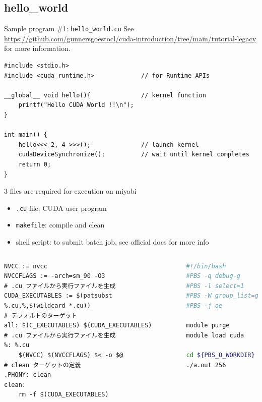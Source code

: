 \documentclass[dvipdfmx, 11pt, aspectratio=169]{beamer}   %
\begin{document}
\subsection{hello\_world}
\begin{frame}[fragile]{Sample program \#1: \texttt{hello\_world.cu}}
  See \url{https://github.com/gunnersgoestocl/cuda-introduction/tree/main/tutorial-legacy} for more information.
\begin{block}{}
  \begin{lstlisting}[language=CUDA]
#include <stdio.h>
#include <cuda_runtime.h>             // for Runtime APIs

__global__ void hello(){              // kernel function
    printf("Hello CUDA World !!\n");
}

int main() {
    hello<<< 2, 4 >>>();              // launch kernel
    cudaDeviceSynchronize();          // wait until kernel completes
    return 0;
}
  \end{lstlisting}
\end{block}
\end{frame}
\begin{frame}[fragile]{3 files are required for execution on miyabi}
  \begin{itemize}
    \item \lstinline|.cu| file: CUDA user program
    \item \lstinline|makefile|: compile and clean
    \item shell script: to submit batch job, see official docs for more info
  \end{itemize}
  \begin{columns}
    \begin{lstlisting}[style=makefilestyle, basicstyle=\ttfamily\tiny]
NVCC := nvcc
NVCCFLAGS := -arch=sm_90 -O3
# .cu ファイルから実行ファイルを生成
CUDA_EXECUTABLES := $(patsubst %.cu,%,$(wildcard *.cu))
# デフォルトのターゲット
all: $(C_EXECUTABLES) $(CUDA_EXECUTABLES)
# .cu ファイルから実行ファイルを生成
%: %.cu
	$(NVCC) $(NVCCFLAGS) $< -o $@
# clean ターゲットの定義
.PHONY: clean
clean:
	rm -f $(CUDA_EXECUTABLES)
\end{lstlisting}
    \begin{lstlisting}[language=sh]
#!/bin/bash
#PBS -q debug-g
#PBS -l select=1
#PBS -W group_list=gc64
#PBS -j oe

module purge
module load cuda

cd ${PBS_O_WORKDIR}
./a.out 256
\end{lstlisting}
  \end{columns}
\end{frame}
\end{document}
